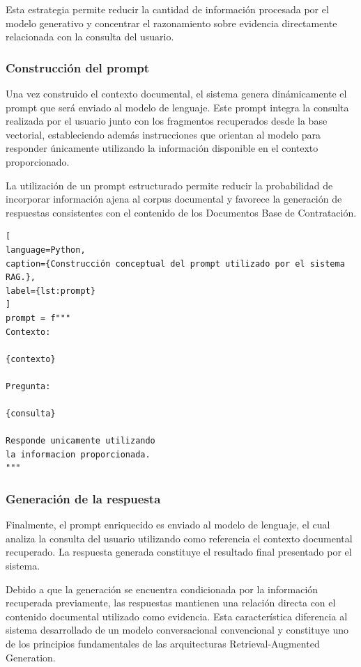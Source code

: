 Esta estrategia permite reducir la cantidad de información procesada por el modelo generativo y concentrar el razonamiento sobre evidencia directamente relacionada con la consulta del usuario.

\subsubsection{Construcción del prompt}

Una vez construido el contexto documental, el sistema genera dinámicamente el prompt que será enviado al modelo de lenguaje. Este prompt integra la consulta realizada por el usuario junto con los fragmentos recuperados desde la base vectorial, estableciendo además instrucciones que orientan al modelo para responder únicamente utilizando la información disponible en el contexto proporcionado.

La utilización de un prompt estructurado permite reducir la probabilidad de incorporar información ajena al corpus documental y favorece la generación de respuestas consistentes con el contenido de los Documentos Base de Contratación.

\begin{lstlisting}[
language=Python,
caption={Construcción conceptual del prompt utilizado por el sistema RAG.},
label={lst:prompt}
]
prompt = f"""
Contexto:

{contexto}

Pregunta:

{consulta}

Responde unicamente utilizando
la informacion proporcionada.
"""
\end{lstlisting}

\subsubsection{Generación de la respuesta}

Finalmente, el prompt enriquecido es enviado al modelo de lenguaje, el cual analiza la consulta del usuario utilizando como referencia el contexto documental recuperado. La respuesta generada constituye el resultado final presentado por el sistema.

Debido a que la generación se encuentra condicionada por la información recuperada previamente, las respuestas mantienen una relación directa con el contenido documental utilizado como evidencia. Esta característica diferencia al sistema desarrollado de un modelo conversacional convencional y constituye uno de los principios fundamentales de las arquitecturas Retrieval-Augmented Generation.

